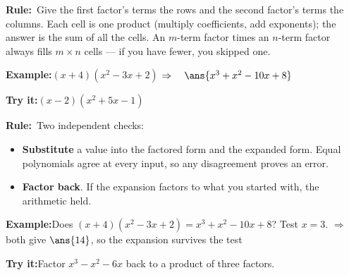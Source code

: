 \documentclass[12pt]{article}
\begin{document}

\begin{formulabox}\textbf{Rule:}\ Give the first factor's terms the rows and
the second factor's terms the columns. Each cell is one product (multiply
coefficients, add exponents); the answer is the sum of all the cells. An
$m$-term factor times an $n$-term factor always fills $m \times n$ cells --- if
you have fewer, you skipped one.
\end{formulabox}

\begin{examplebox}\textbf{Example:}\quad $(x + 4)(x^2 - 3x + 2)$
$\Rightarrow\quad \ans{x^3+x^2-10x+8}$
\end{examplebox}

\begin{tryitbox}\textbf{Try it:}\quad $(x - 2)(x^2 + 5x - 1)$\\[2pt]
\end{tryitbox}


\begin{formulabox}\textbf{Rule:}\ Two independent checks:
\begin{itemize}[leftmargin=0.8cm, itemsep=1pt, topsep=2pt]
  \item \textbf{Substitute} a value into the factored form and the expanded
        form. Equal polynomials agree at every input, so any disagreement
        proves an error.
  \item \textbf{Factor back}. If the expansion factors to what you started
        with, the arithmetic held.
\end{itemize}
\end{formulabox}

\begin{examplebox}\textbf{Example:}\quad Does $(x+4)(x^2-3x+2) = x^3+x^2-10x+8$?
Test $x = 3$.
$\Rightarrow\quad$ both give $\ans{14}$, so the expansion survives the test
\end{examplebox}

\begin{tryitbox}\textbf{Try it:}\quad Factor $x^3 - x^2 - 6x$ back to a product
of three factors.\\[2pt]
\end{tryitbox}
\end{document}
